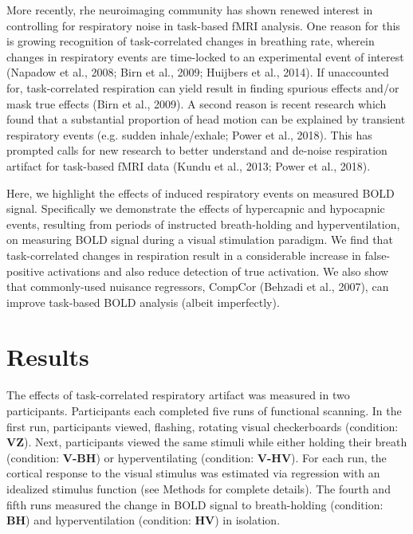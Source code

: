 \documentclass[9pt]{NEU502b-fmri}
\begin{document}
More recently, rhe neuroimaging community has shown renewed interest in controlling for respiratory noise in task-based fMRI analysis. One reason for this is growing recognition of task-correlated changes in breathing rate, wherein changes in respiratory events are time-locked to an experimental event of interest (Napadow et al., 2008; Birn et al., 2009; Huijbers et al., 2014). If unaccounted for, task-correlated respiration can yield result in finding spurious effects and/or mask true effects (Birn et al., 2009). A second reason is recent research which found that a substantial proportion of head motion can be explained by transient respiratory events (e.g. sudden inhale/exhale; Power et al., 2018). This has prompted calls for new research to better understand and de-noise respiration artifact for task-based fMRI data (Kundu et al., 2013; Power et al., 2018). 

Here, we highlight the effects of induced respiratory events on measured BOLD signal. Specifically we demonstrate the effects of hypercapnic and hypocapnic events, resulting from periods of instructed breath-holding and hyperventilation, on measuring BOLD signal during a visual stimulation paradigm. We find that task-correlated changes in respiration result in a considerable increase in false-positive activations and also reduce detection of true activation. We also show that commonly-used nuisance regressors, CompCor (Behzadi et al., 2007), can improve task-based BOLD analysis (albeit imperfectly). 

\section{Results}
The effects of task-correlated respiratory artifact was measured in two participants. Participants each completed five runs of functional scanning. In the first run, participants viewed, flashing, rotating visual checkerboards (condition: \textbf{VZ}). Next, participants viewed the same stimuli while either holding their breath (condition: \textbf{V-BH}) or hyperventilating (condition: \textbf{V-HV}). For each run, the cortical response to the visual stimulus was estimated via regression with an idealized stimulus function (see Methods for complete details). The fourth and fifth runs measured the change in BOLD signal to breath-holding (condition: \textbf{BH}) and hyperventilation (condition: \textbf{HV}) in isolation. 
\end{document}
